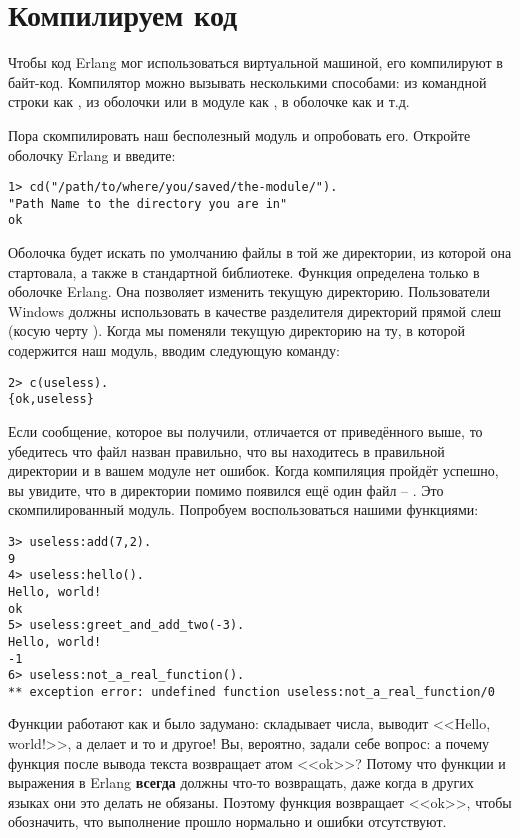 \section{Компилируем код}
Чтобы код Erlang мог использоваться виртуальной машиной, его компилируют в байт\--код.
Компилятор можно вызывать несколькими способами: из командной строки как , из оболочки или в модуле как , в оболочке как  и т.д.

Пора скомпилировать наш бесполезный модуль и опробовать его.
Откройте оболочку Erlang и введите:
\begin{lstlisting}[style=erlang]
1> cd("/path/to/where/you/saved/the-module/").
"Path Name to the directory you are in"
ok
\end{lstlisting}

Оболочка будет искать по умолчанию файлы в той же директории, из которой она стартовала, а также в стандартной библиотеке.
Функция  определена только в оболочке Erlang.
Она позволяет изменить текущую директорию.
Пользователи Windows должны использовать в качестве разделителя директорий прямой слеш (косую черту \ops{\//}).
Когда мы поменяли текущую директорию на ту, в которой содержится наш модуль, вводим следующую команду:
\begin{lstlisting}[style=erlang]
2> c(useless).
{ok,useless}
\end{lstlisting}

Если сообщение, которое вы получили, отличается от приведённого выше, то убедитесь что файл назван правильно, что вы находитесь в правильной директории и в вашем модуле нет ошибок.
Когда компиляция пройдёт успешно, вы увидите, что в директории помимо  появился ещё один файл \--- .
Это скомпилированный модуль.
Попробуем воспользоваться нашими функциями:
\begin{lstlisting}[style=erlang]
3> useless:add(7,2).
9
4> useless:hello().
Hello, world!
ok
5> useless:greet_and_add_two(-3).
Hello, world!
-1
6> useless:not_a_real_function().
** exception error: undefined function useless:not_a_real_function/0
\end{lstlisting}

Функции работают как и было задумано:  складывает числа,  выводит <<Hello, world!>>, а  делает и то и другое!
Вы, вероятно, задали себе вопрос: а почему функция  после вывода текста возвращает атом <<ok>>?
Потому что функции и выражения в Erlang \textbf{всегда} должны что\--то возвращать, даже когда в других языках они это делать не обязаны.
Поэтому функция  возвращает <<ok>>, чтобы обозначить, что выполнение прошло нормально и ошибки отсутствуют.


